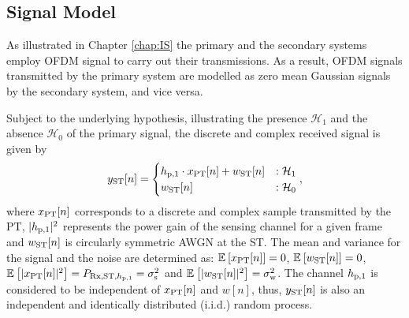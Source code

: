 

\subsection{Signal Model}
As illustrated in Chapter \ref{chap:IS} the primary and the secondary systems employ OFDM signal to carry out their transmissions. As a result, OFDM signals transmitted by the primary system are modelled as zero mean Gaussian signals by the secondary system, and vice versa. 

Subject to the underlying hypothesis, illustrating the presence $\mathcal H_1$ and the absence $\mathcal H_0$ of the primary signal, the discrete and complex received signal is given by 
\begin{equation}
y_{\text{ST}}[n] = 
\begin{cases}
h_{\text{p,1}} \cdot x_{\text{PT}}[n] + w_{\text{ST}}[n] & : \mathcal{H}_1 \\
w_{\text{ST}}[n] & :\mathcal{H}_0
\end{cases},
\label{eq_HS:sig_mod_st}
\end{equation}
where $x_{\text{PT}}[n]$ corresponds to a discrete and complex sample transmitted by the PT, $|h_{\text{p,1}}|^2$ represents the power gain of the sensing channel for a given frame and $w_{\text{ST}}[n]$ is circularly symmetric AWGN at the ST. 
The mean and variance for the signal and the noise are determined as: ${\mathbb E}_{}\left[ x_{\text{PT}}[n] \right] = 0$, ${\mathbb E}_{}\left[ w_{\text{ST}}[n] \right] = 0$, ${\mathbb E}_{}\left[ |x_{\text{PT}}[n]|^2 \right] = P_{\text{Rx,ST,$h_{\text{p,1}}$}} = \sigma^2_{\text{s}}$ and ${\mathbb E}_{}\left[ |w_{\text{ST}}[n]|^2 \right] = \sigma^2_{\text{w}}$. 
The channel $h_{\text{p,1}}$ is considered to be independent of $x_{\text{PT}}[n]$ and $w[n]$, thus, $y_{\text{ST}}[n]$ is also an independent and identically distributed (i.i.d.) random process.

